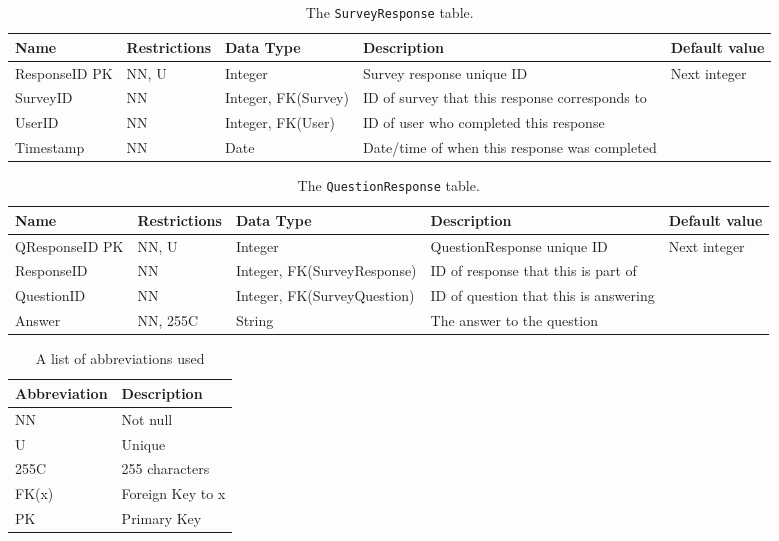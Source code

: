 \begin{table}[H]
  \centering
  \caption{The \texttt{SurveyResponse} table.}
    \begin{tabularx}{\textwidth}{llp{2.5cm}Xl}
    \hline
    Name  & Restrictions & Data Type & Description & Default value \\
    \hline
    ResponseID PK & NN, U & Integer & Survey response unique ID & Next integer \\
    SurveyID & NN    & Integer, FK(Survey) & ID of survey that this response corresponds to &  \\
    UserID & NN    & Integer, FK(User) & ID of user who completed this response &  \\
    Timestamp & NN    & Date  & Date/time of when this response was completed &  \\
    \hline
    \end{tabularx}%
  \label{tab:dd:SurveyResponse}%
\end{table}%


\begin{table}[H]
  \centering
  \caption{The \texttt{QuestionResponse} table.}
    \begin{tabularx}{\textwidth}{lllXl}
    \hline
    Name  & Restrictions & Data Type & Description & Default value \\
    \hline
    QResponseID PK & NN, U & Integer & QuestionResponse unique ID & Next integer \\
    ResponseID & NN    & Integer, FK(SurveyResponse) & ID of response that this is part of &  \\
    QuestionID & NN    & Integer, FK(SurveyQuestion) & ID of question that this is answering &  \\
    Answer & NN, 255C & String & The answer to the question &  \\
    \hline
    \end{tabularx}%
  \label{tab:dd:QuestionResponse}%
\end{table}%


\begin{table}[H]
  \centering
  \caption{A list of abbreviations used}
    \begin{tabular}{ll}
    \hline
    Abbreviation & Description \\
    \hline
    NN    & Not null \\
    U     & Unique \\
    255C  & 255 characters \\
    FK(x) & Foreign Key to x \\
    PK    & Primary Key \\
    \hline
    \end{tabular}%
  \label{tab:abbreviations}%
\end{table}%


